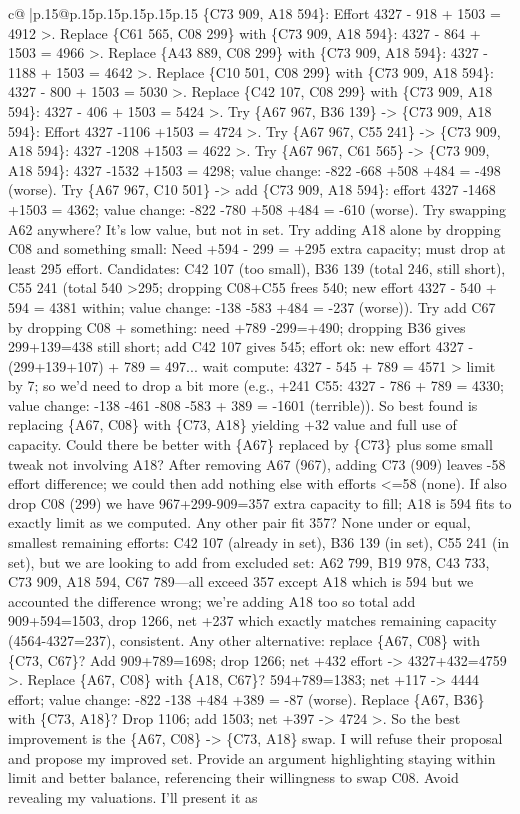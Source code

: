 \documentclass{article}
\begin{document}
{\begin{supertabular}{c@{$\;$}|p{.15\linewidth}@{}p{.15\linewidth}p{.15\linewidth}p{.15\linewidth}p{.15\linewidth}p{.15\linewidth}}
{{{\{C73 909, A18 594\}: Effort 4327 {-} 918 + 1503 = 4912 >. Replace \{C61 565, C08 299\} with \{C73 909, A18 594\}: 4327 {-} 864 + 1503 = 4966 >. Replace \{A43 889, C08 299\} with \{C73 909, A18 594\}: 4327 {-} 1188 + 1503 = 4642 >. Replace \{C10 501, C08 299\} with \{C73 909, A18 594\}: 4327 {-} 800 + 1503 = 5030 >. Replace \{C42 107, C08 299\} with \{C73 909, A18 594\}: 4327 {-} 406 + 1503 = 5424 >. Try \{A67 967, B36 139\} {-}> \{C73 909, A18 594\}: Effort 4327 {-}1106 +1503 = 4724 >. Try \{A67 967, C55 241\} {-}> \{C73 909, A18 594\}: 4327 {-}1208 +1503 = 4622 >. Try \{A67 967, C61 565\} {-}> \{C73 909, A18 594\}: 4327 {-}1532 +1503 = 4298; value change: {-}822 {-}668 +508 +484 = {-}498 (worse). Try \{A67 967, C10 501\} {-}> add \{C73 909, A18 594\}: effort 4327 {-}1468 +1503 = 4362; value change: {-}822 {-}780 +508 +484 = {-}610 (worse). Try swapping A62 anywhere? It's low value, but not in set. Try adding A18 alone by dropping C08 and something small: Need +594 {-} 299 = +295 extra capacity; must drop at least 295 effort. Candidates: C42 107 (too small), B36 139 (total 246, still short), C55 241 (total 540 >295; dropping C08+C55 frees 540; new effort 4327 {-} 540 + 594 = 4381 within; value change: {-}138 {-}583 +484 = {-}237 (worse)). Try add C67 by dropping C08 + something: need +789 {-}299=+490; dropping B36 gives 299+139=438 still short; add C42 107 gives 545; effort ok: new effort 4327 {-} (299+139+107) + 789 = 497... wait compute: 4327 {-} 545 + 789 = 4571 > limit by 7; so we’d need to drop a bit more (e.g., +241 C55: 4327 {-} 786 + 789 = 4330; value change: {-}138 {-}461 {-}808 {-}583 + 389 = {-}1601 (terrible)). So best found is replacing \{A67, C08\} with \{C73, A18\} yielding +32 value and full use of capacity. Could there be better with \{A67\} replaced by \{C73\} plus some small tweak not involving A18? After removing A67 (967), adding C73 (909) leaves {-}58 effort difference; we could then add nothing else with efforts <=58 (none). If also drop C08 (299) we have 967+299{-}909=357 extra capacity to fill; A18 is 594 fits to exactly limit as we computed. Any other pair fit 357? None under or equal, smallest remaining efforts: C42 107 (already in set), B36 139 (in set), C55 241 (in set), but we are looking to add from excluded set: A62 799, B19 978, C43 733, C73 909, A18 594, C67 789—all exceed 357 except A18 which is 594 but we accounted the difference wrong; we’re adding A18 too so total add 909+594=1503, drop 1266, net +237 which exactly matches remaining capacity (4564{-}4327=237), consistent. Any other alternative: replace \{A67, C08\} with \{C73, C67\}? Add 909+789=1698; drop 1266; net +432 effort {-}> 4327+432=4759 >. Replace \{A67, C08\} with \{A18, C67\}? 594+789=1383; net +117 {-}> 4444 effort; value change: {-}822 {-}138 +484 +389 = {-}87 (worse). Replace \{A67, B36\} with \{C73, A18\}? Drop 1106; add 1503; net +397 {-}> 4724 >. So the best improvement is the \{A67, C08\} {-}> \{C73, A18\} swap. I will refuse their proposal and propose my improved set. Provide an argument highlighting staying within limit and better balance, referencing their willingness to swap C08. Avoid revealing my valuations. I’ll present it as }}}
\end{supertabular}}
\end{document}
